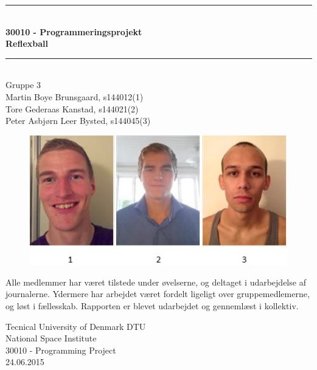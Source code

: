 \begin{titlepage}

\centering \parindent=0pt
\newcommand{\HRule}{\rule{\textwidth}{1mm}}
 \HRule\\[0.7cm]\Huge\bfseries
30010 - Programmeringsprojekt \\[0.7cm] %
Reflexball\\ %
\HRule\\[2cm]  
\Large
Gruppe 3
\\
\large
Martin Boye Brunsgaard, s144012(1)	\\
Tore Gederaas Kanstad, s144021(2) \\
Peter Asbjørn Leer Bysted, s144045(3) \\
\begin{figure}[h]
\begin{center}
\includegraphics[scale=0.6]{img/faces.jpg}
\end{center}
\end{figure}

 \normalsize

Alle medlemmer har været tilstede under øvelserne, og deltaget i udarbejdelse af journalerne. Ydermere har arbejdet været fordelt ligeligt over gruppemedlemerne, og løst i fællesskab. Rapporten er blevet udarbejdet og gennemlæst i kollektiv.
\begin{flushleft}
Tecnical University of Denmark DTU\\ %
National Space Institute\\ 
30010 - Programming Project\\ %
24.06.2015 %
\end{flushleft}
\end{titlepage}
\newpage
\renewcommand{\abstractname}{Abstract}
